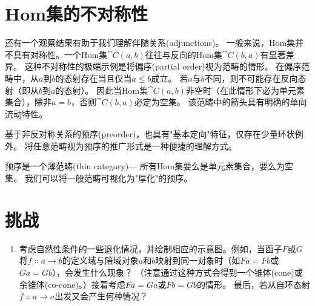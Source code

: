 \section{Hom集的不对称性}

还有一个观察结果有助于我们理解伴随关系(adjunctions)。
一般来说，Hom集并不具有对称性。一个Hom集$\cat{C}(a, b)$往往与反向的Hom集$\cat{C}(b, a)$有显著差异。
这种不对称性的极端示例是将偏序(partial order)视为范畴的情形。
在偏序范畴中，从$a$到$b$的态射存在当且仅当$a \leq b$成立。
若$a$与$b$不同，则不可能存在反向态射（即从$b$到$a$的态射）。
因此当Hom集$\cat{C}(a, b)$非空时（在此情形下必为单元素集合），除非$a = b$，否则$\cat{C}(b, a)$必定为空集。
该范畴中的箭头具有明确的单向流动特性。

基于非反对称关系的预序(preorder)，也具有"基本定向"特征，仅存在少量环状例外。
将任意范畴视为预序的推广形式是一种便捷的理解方式。

预序是一个薄范畴(thin category)--- 所有Hom集要么是单元素集合，要么为空集。
我们可以将一般范畴可视化为"厚化"的预序。

\section{挑战}

\begin{enumerate}
  \tightlist
  \item
        考虑自然性条件的一些退化情况，并绘制相应的示意图。例如，当函子$F$或$G$将$f \Colon a \to b$的定义域与陪域对象$a$和$b$映射到同一对象时（如$F a = F b$或$G a = G b$），会发生什么现象？
        （注意通过这种方式会得到一个锥体(cone)或余锥体(co-cone)。）接着考虑$F a = G a$或$F b = G b$的情形。
        最后，若从自环态射$f \Colon a \to a$出发又会产生何种情况？
\end{enumerate}